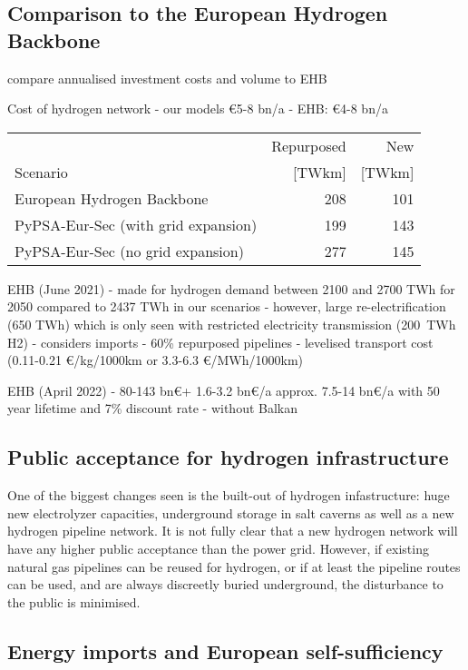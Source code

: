 \subsection*{Comparison to the European Hydrogen Backbone}

compare annualised investment costs and volume to EHB

Cost of hydrogen network
- our models \euro 5-8 bn/a
- EHB: \euro 4-8 bn/a

\begin{tabular}{lrr}
    \toprule
     & Repurposed & New \\
     Scenario& [TWkm] & [TWkm] \\
    \midrule
    European Hydrogen Backbone & 208 & 101 \\
    PyPSA-Eur-Sec (with grid expansion) & 199 & 143 \\
    PyPSA-Eur-Sec (no grid expansion) & 277 & 145 \\
    \bottomrule
  \end{tabular}

EHB (June 2021)
- made for hydrogen demand between 2100 and 2700 TWh for 2050 compared to 2437 TWh in our scenarios
- however, large re-electrification (650 TWh) which is only seen with restricted electricity transmission (200~TWh H2)
- considers imports
- 60\% repurposed pipelines
- levelised transport cost (0.11-0.21 \euro/kg/1000km or 3.3-6.3 \euro/MWh/1000km)

EHB (April 2022)
- 80-143 bn\euro + 1.6-3.2 bn\euro/a approx. 7.5-14 bn\euro/a with 50 year lifetime and 7\% discount rate
- without Balkan

\cite{gasforclimateExtendingEuropean2021}

\subsection*{Public acceptance for hydrogen infrastructure}

One of the biggest changes seen is the built-out of hydrogen infastructure: huge new
electrolyzer capacities, underground storage in salt caverns as well
as a new hydrogen pipeline network. It is not fully clear that a new
hydrogen network will have any higher public acceptance than the power
grid. However, if existing natural gas pipelines can be reused for hydrogen,
or if at least the pipeline routes can be used, and are always discreetly buried underground, the disturbance to
the public is minimised.

\subsection*{Energy imports and European self-sufficiency}

